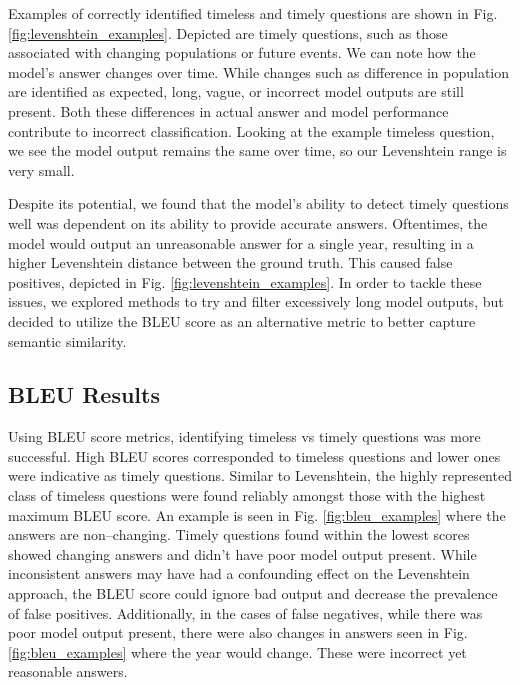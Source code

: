 \documentclass{article}
\begin{document}
Examples of correctly identified timeless and timely questions are shown in Fig. \ref{fig:levenshtein_examples}. Depicted are timely questions, such as those associated with changing populations or future events. We can note how the model’s answer changes over time. While changes such as difference in population are identified as expected, long, vague, or incorrect model outputs are still present. Both these differences in actual answer and model performance contribute to incorrect classification. Looking at the example timeless question, we see the model output remains the same over time, so our Levenshtein range is very small.

Despite its potential, we found that the model’s ability to detect timely questions well was dependent on its ability to provide accurate answers. Oftentimes, the model would output an unreasonable answer for a single year, resulting in a higher Levenshtein distance between the ground truth. This caused false positives, depicted in Fig. \ref{fig:levenshtein_examples}. In order to tackle these issues, we explored methods to try and filter excessively long model outputs, but decided to utilize the BLEU score as an alternative metric to better capture semantic similarity. 




\subsection{BLEU Results}
\label{bleu results}

Using BLEU score metrics, identifying timeless vs timely questions was more successful. High BLEU scores corresponded to timeless questions and lower ones were indicative as timely questions. Similar to Levenshtein, the highly represented class of timeless questions were found reliably amongst those with the highest maximum BLEU score. An example is seen in Fig. \ref{fig:bleu_examples} where the answers are non--changing. Timely questions found within the lowest scores showed changing answers and didn't have poor model output present. While inconsistent answers may have had a confounding effect on the Levenshtein approach, the BLEU score could ignore bad output and decrease the prevalence of false positives. Additionally, in the cases of false negatives, while there was poor model output present, there were also changes in answers seen in Fig. \ref{fig:bleu_examples} where the year would change. These were incorrect yet reasonable answers.
\end{document}
